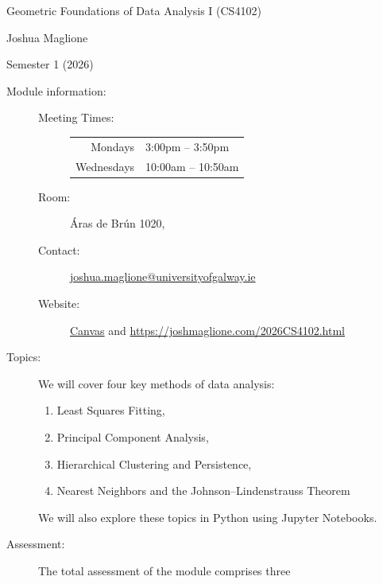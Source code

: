 \documentclass[a4paper, 12pt]{article}
\begin{document}
\pagestyle{empty}

\begin{center}
{\Large Geometric Foundations of Data Analysis I (CS4102)} 

\vspace{0.25cm}

{\large Joshua Maglione}

\vspace{0.25cm}

Semester 1 (2026)
\end{center}

\vspace{0.5cm}

\begin{description}
    \item[Module information:] \hfill
    \begin{description}
      \item[Meeting Times:] \hfill
      \begin{center}
        \begin{tabular}{rl}
          Mondays & 3:00pm -- 3:50pm \\ 
          Wednesdays & 10:00am -- 10:50am
        \end{tabular}
      \end{center}
      \item[Room:] \'Aras de Br\'un 1020,
      \item[Contact:] \url{joshua.maglione@universityofgalway.ie} 
      \item[Website:] \href{https://universityofgalway.instructure.com/}{\textsf{Canvas}} and \url{https://joshmaglione.com/2026CS4102.html} 
    \end{description} 
    \vspace{1cm}
    \item[Topics:] We will cover four key methods of data analysis:
    \begin{enumerate} 
      \item Least Squares Fitting,
      \item Principal Component Analysis,
      \item Hierarchical Clustering and Persistence,
      \item Nearest Neighbors and the Johnson--Lindenstrauss Theorem
    \end{enumerate}
    We will also explore these topics in Python using Jupyter Notebooks.
    \vspace{1cm}
    \item[Assessment:] The total assessment of the module comprises three

\end{description}
\end{document}

